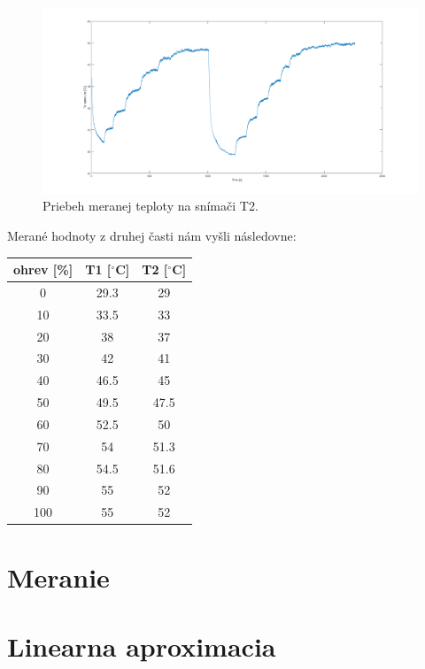 \documentclass{article}
\begin{document}
\begin{figure}[!htbp]
	\begin{center}
		\includegraphics[width=\textwidth]{./include/teplota.png}
		\caption{Priebeh meranej teploty na snímači T2.}
		\label{fig:mt2}
	\end{center}
	\hfill
\end{figure}

Merané hodnoty z druhej časti nám vyšli následovne:

\begin{center}
\begin{tabular}{ |c|c|c| }
 \hline
 ohrev [\%] & T1 [$^\circ $C] & T2 [$^\circ $C] \\
 \hline
   0 & 29.3 & 29 \\
  10 & 33.5 & 33 \\
  20 & 38 & 37 \\
  30 & 42 & 41\\
  40 & 46.5 & 45\\
  50 & 49.5 & 47.5\\
  60 & 52.5 & 50 \\
  70 & 54 & 51.3 \\
  80 & 54.5 & 51.6 \\
  90 & 55 & 52 \\
 100 & 55 & 52 \\
 \hline
\end{tabular}
\end{center}
\newpage

\section{Meranie}
\label{sec:meranie}

\clearpage

\section{Linearna aproximacia}
\label{sec:lin}
\end{document}
